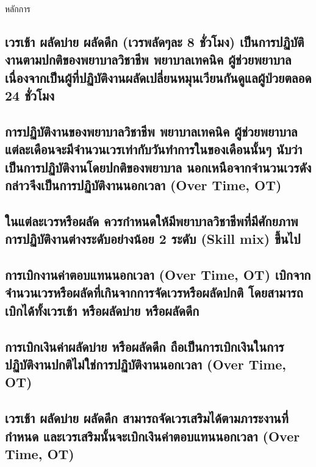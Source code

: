หลักการ


\hspace{0.5cm}\hangindent=2.7cm\subsection{เวรเช้า ผลัดบ่าย ผลัดดึก (เวรพลัดๆละ 8 ชั่วโมง) เป็นการปฏิบัติงานตามปกติของพยาบาลวิชาชีพ พยาบาลเทคนิค ผู้ช่วยพยาบาล เนื่องจากเป็นผู้ที่ปฏิบัติงานผลัดเปลี่ยนหมุนเวียนกันดูแลผู้ป่วยตลอด 24 ชั่วโมง}

\hspace{0.5cm}\hangindent=2.7cm\subsection{การปฏิบัติงานของพยาบาลวิชาชีพ พยาบาลเทคนิค ผู้ช่วยพยาบาล แต่ละเดือนจะมีจำนวนเวรเท่ากับวันทำการในของเดือนนั้นๆ นับว่าเป็นการปฏิบัติงานโดยปกติของพยาบาล นอกเหนือจากจำนวนเวรดังกล่าวจึงเป็นการปฏิบัติงานนอกเวลา (Over Time, OT)}

\hspace{0.5cm}\hangindent=2.7cm\subsection{ในแต่ละเวรหรือผลัด ควรกำหนดให้มีพยาบาลวิชาชีพที่มีศักยภาพการปฏิบัติงานต่างระดับอย่างน้อย 2 ระดับ (Skill mix) ขึ้นไป}

\hspace{0.5cm}\hangindent=2.7cm\subsection{การเบิกงานค่าตอบแทนนอกเวลา (Over Time, OT) เบิกจากจำนวนเวรหรือผลัดที่เกินจากการจัดเวรหรือผลัดปกติ โดยสามารถเบิกได้ทั้งเวรเช้า หรือผลัดบ่าย หรือผลัดดึก}

\hspace{0.4cm}\hangindent=2.7cm\subsection{การเบิกเงินค่าผลัดบ่าย หรือผลัดดึก ถือเป็นการเบิกเงินในการปฏิบัติงานปกติไม่ใช่การปฏิบัติงานนอกเวลา (Over Time, OT)}


\hspace{0.5cm}\hangindent=2.7cm\subsection{เวรเช้า ผลัดบ่าย ผลัดดึก สามารถจัดเวรเสริมได้ตามภาระงานที่กำหนด และเวรเสริมนั้นจะเบิกเงินค่าตอบแทนนอกเวลา (Over Time, OT)}

